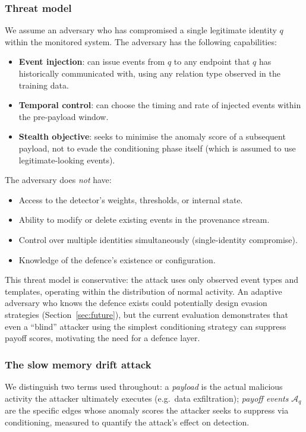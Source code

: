 \documentclass[10pt,twocolumn]{article}
\begin{document}
\subsubsection{Threat model}
\label{sec:threat}

We assume an adversary who has compromised a single legitimate identity
$q$ within the monitored system.  The adversary has the following
capabilities:
\begin{itemize}
  \item \textbf{Event injection}: can issue events from $q$ to any
    endpoint that $q$ has historically communicated with, using any
    relation type observed in the training data.
  \item \textbf{Temporal control}: can choose the timing and rate of
    injected events within the pre-payload window.
  \item \textbf{Stealth objective}: seeks to minimise the anomaly score
    of a subsequent payload, not to evade the conditioning phase itself
    (which is assumed to use legitimate-looking events).
\end{itemize}

The adversary does \emph{not} have:
\begin{itemize}
  \item Access to the detector's weights, thresholds, or internal state.
  \item Ability to modify or delete existing events in the provenance
    stream.
  \item Control over multiple identities simultaneously (single-identity
    compromise).
  \item Knowledge of the defence's existence or configuration.
\end{itemize}

This threat model is conservative: the attack uses only observed event
types and templates, operating within the distribution of normal activity.
An adaptive adversary who knows the defence exists could potentially
design evasion strategies (Section~\ref{sec:future}), but the current
evaluation demonstrates that even a ``blind'' attacker using the simplest
conditioning strategy can suppress payoff scores, motivating the need
for a defence layer.

\subsubsection{The slow memory drift attack}

We distinguish two terms used throughout: a \emph{payload} is the actual
malicious activity the attacker ultimately executes (e.g.\ data
exfiltration); \emph{payoff events} $\mathcal{A}_q$ are the specific
edges whose anomaly scores the attacker seeks to suppress via
conditioning, measured to quantify the attack's effect on detection.
\end{document}
